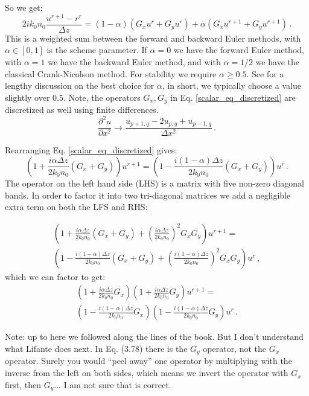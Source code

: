 \documentclass[]{article}
\begin{document}
	So we get:
	\begin{equation}
		2ik_0 n_0 \frac{u^{r+1}-r^r}{\Delta z} = (1-\alpha)\left( G_x u^r+G_y u^r\right) +\alpha\left( G_x u^{r+1}+G_y u^{r+1}\right)\, .
		\label{scalar_eq_discretized}
	\end{equation}
	This is a weighted sum between the forward and backward Euler methods, with $\alpha\in[0,1]$ is the scheme parameter. If $\alpha=0$ we have the forward Euler method, with $\alpha=1$ we have the backward Euler method, and with $\alpha=1/2$ we have the classical Crank-Nicolson method. For stability we require $\alpha \ge 0.5$. See \cite{Lifante_2015} for a lengthy discussion on the best choice for $\alpha$, in short, we typically choose a value slightly over 0.5. Note, the operators $G_x, G_y$ in Eq. \eqref{scalar_eq_discretized} are discretized as well using finite differences.
	\begin{equation}
		\frac{\partial^2 u}{\partial x^2} \to \frac{u_{p+1,q}-2u_{p,q}+u_{p-1,q}}{\Delta x^2}\, .
	\end{equation}
	
	Rearranging Eq. \eqref{scalar_eq_discretized} gives:
	\begin{equation}
		\left(1+\frac{i\alpha \Delta z}{2k_0 n_0}(G_x+G_y) \right) u^{r+1} = \left(1-\frac{i(1-\alpha) \Delta z}{2k_0 n_0}(G_x+G_y) \right) u^r \, .
	\end{equation}
	The operator on the left hand side (LHS) is a matrix with five non-zero diagonal bands. In order to factor it into two tri-diagonal matrices we add a negligible extra term on both the LFS and RHS:
	
	\begin{multline*}
		\left(1+\frac{i\alpha \Delta z}{2k_0 n_0}(G_x+G_y) + \left(\frac{i\alpha \Delta z}{2k_0 n_0} \right) ^2 G_x G_y \right) u^{r+1} =\\
		 \left(1-\frac{i(1-\alpha) \Delta z}{2k_0 n_0}(G_x+G_y) +\left( \frac{i(1-\alpha) \Delta z}{2k_0 n_0}\right)^2 G_x G_y \right) u^r \, ,
	\end{multline*}
	which we can factor to get:
	\begin{multline}
		\left(1+\frac{i\alpha \Delta z}{2k_0 n_0}G_x \right)\left(1+\frac{i\alpha \Delta z}{2k_0 n_0}G_y \right) u^{r+1} = \\
		\left(1-\frac{i(1-\alpha) \Delta z}{2k_0 n_0}G_x \right)\left(1-\frac{i(1-\alpha) \Delta z}{2k_0 n_0}G_y \right) u^r \, .
		\label{ADI_setup}
	\end{multline}
	
	Note: up to here we followed along the lines of the book\cite{Lifante_2015}. But I don't understand what Lifante does next. In Eq. (3.78) there is the $G_y$ operator, not the $G_x$ operator. Surely you would ``peel away'' one operator by multiplying with the inverse from the left on both sides, which means we invert the operator with $G_x$ first, then $G_y$... I am not sure that is correct.\\
	
\end{document}
